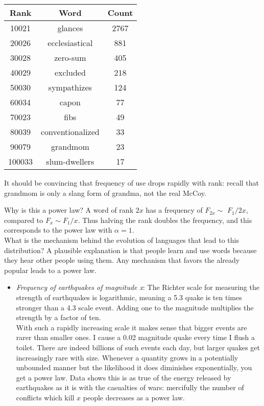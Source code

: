 \documentclass[10pt]{article}
\begin{document}
\begin{center}
\begin{tabular}{c|c|c}
Rank & Word & Count \\
\hline
10021 & glances & 2767 \\
20026 & ecclesiastical & 881 \\
30028 & zero-sum & 405 \\
40029 & excluded & 218 \\
50030 & sympathizes & 124 \\
60034 & capon & 77 \\
70023 & fibs & 49 \\
80039 & conventionalized & 33 \\
90079 & grandmom & 23 \\
100033 & slum-dwellers & 17 \\
\end{tabular}
\end{center}

It should be convincing that frequency of use drops rapidly with rank: recall that grandmom is only a slang form of grandma, not the real McCoy.

Why is this a power law? A word of rank $2 x$ has a frequency of $F_{2 x} \sim$ $F_{1} / 2 x$, compared to $F_{x} \sim F_{1} / x$. Thus halving the rank doubles the frequency, and this corresponds to the power law with $\alpha=1$.\\
What is the mechanism behind the evolution of languages that lead to this distribution? A plausible explanation is that people learn and use words because they hear other people using them. Any mechanism that favors the already popular leads to a power law.

\begin{itemize}
  \item \emph{Frequency of earthquakes of magnitude x}: The Richter scale for measuring the strength of earthquakes is logarithmic, meaning a 5.3 quake is ten times stronger than a 4.3 scale event. Adding one to the magnitude multiplies the strength by a factor of ten.\\
With such a rapidly increasing scale it makes sense that bigger events are rarer than smaller ones. I cause a 0.02 magnitude quake every time I flush a toilet. There are indeed billions of such events each day, but larger quakes get increasingly rare with size. Whenever a quantity grows in a potentially unbounded manner but the likelihood it does diminishes exponentially, you get a power law. Data shows this is as true of the energy released by earthquakes as it is with the casualties of wars: mercifully the number of conflicts which kill $x$ people decreases as a power law.
\end{itemize}
\end{document}
